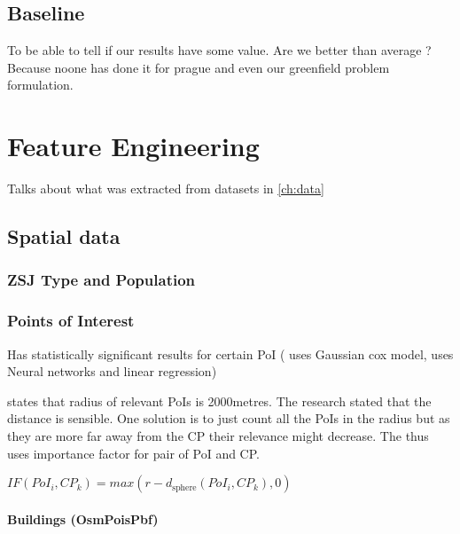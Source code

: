 
\section{Baseline}

To be able to tell if our results have some value.
Are we better than average ? Because noone has done it for prague and even our greenfield problem formulation.

\setchapterpreamble[u]{\margintoc}
\chapter{Feature Engineering}

Talks about what was extracted from datasets in \ref{ch:data}

\section{Spatial data}

\subsection{ZSJ Type and Population}

\subsection{Points of Interest}

Has statistically significant results for certain PoI \cite{hechtGlobalElectricVehicle2024}\cite{dongElectricVehicleCharging2019}
(\cite{dongElectricVehicleCharging2019} uses Gaussian cox model, \cite{hechtGlobalElectricVehicle2024} uses Neural networks and linear regression)

\cite{hechtGlobalElectricVehicle2024} states that radius of relevant PoIs is 2000metres. The research stated that the distance is sensible.
One solution is to just count all the PoIs in the radius but as they are more far away from the CP their relevance might decrease. The \cite{hechtGlobalElectricVehicle2024} thus uses importance factor for pair of PoI and CP.

$IF(PoI_i, CP_k) = max(r-d_{\text{sphere}}(PoI_i, CP_k),0)$


\subsubsection{Buildings (OsmPoisPbf)}


